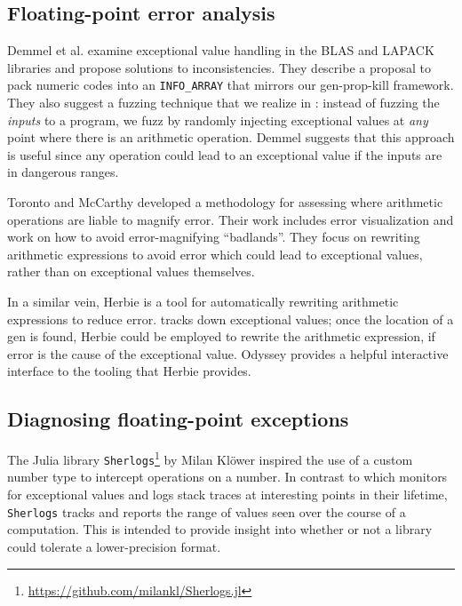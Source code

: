 \documentclass{juliacon}
\begin{document}
\subsection{Floating-point error analysis}

Demmel et al.\cite{ddghlllprr-correctness-2022} examine \fp{} exceptional value handling in the BLAS and LAPACK libraries and propose solutions to inconsistencies.
They describe a proposal to pack numeric codes into an \texttt{INFO\_ARRAY} that mirrors our gen-prop-kill framework.
They also suggest a fuzzing technique that we realize in \FT{}:
instead of fuzzing the \emph{inputs} to a program, we fuzz by randomly injecting exceptional values at \emph{any} point where there is an arithmetic operation. Demmel suggests that this approach is useful since any \fp{} operation could lead to an exceptional value if the inputs are in dangerous ranges.

Toronto and McCarthy\cite{torontoPracticallyAccurateFloatingPoint2014} developed a methodology for assessing where arithmetic operations are liable to magnify \fp{} error.
Their work includes error visualization and work on how to avoid error-magnifying ``badlands''.
They focus on rewriting arithmetic expressions to avoid error which could lead to exceptional values, rather than on exceptional values themselves.

In a similar vein, Herbie\cite{panchekhaAutomaticallyImprovingAccuracy2015} is a tool for automatically rewriting arithmetic expressions to reduce \fp{} error.
\FT{} tracks down exceptional \fp{} values; once the location of a gen is found, Herbie could be employed to rewrite the arithmetic expression, if \fp{} error is the cause of the exceptional value.
Odyssey\cite{misbackOdysseyInteractiveWorkbench2023} provides a helpful interactive interface to the tooling that Herbie provides.

\subsection{Diagnosing floating-point exceptions}

The Julia library \texttt{Sherlogs}\footnote{\url{https://github.com/milankl/Sherlogs.jl}} by Milan Klöwer inspired the use of a custom number type to intercept operations on a number.
In contrast to \FT{} which monitors for exceptional values and logs stack traces at interesting points in their lifetime, \texttt{Sherlogs} tracks and reports the range of values seen over the course of a computation.
This is intended to provide insight into whether or not a library could tolerate a lower-precision \fp{} format.
\end{document}

